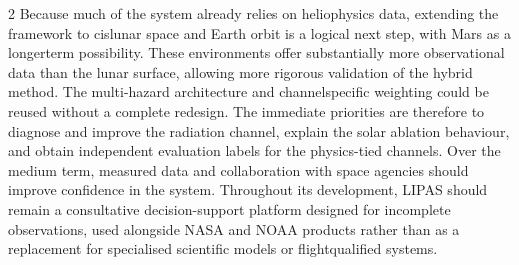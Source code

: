\begin{multicols}{2}
Because much of the system already relies on heliophysics data, extending the framework to cislunar space and Earth orbit is a logical next step, with Mars as a longerterm possibility. These environments offer substantially more observational data than the lunar surface, allowing more rigorous validation of the hybrid method. The multi-hazard architecture and channelspecific weighting could be reused without a complete redesign. The immediate priorities are therefore to diagnose and improve the radiation channel, explain the solar ablation behaviour, and obtain independent evaluation labels for the physics-tied channels. Over the medium term, measured data and collaboration with space agencies should improve confidence in the system. Throughout its development, LIPAS should remain a consultative decision-support platform designed for incomplete observations, used alongside NASA and NOAA products rather than as a replacement for specialised scientific models or flightqualified systems.
\end{multicols}
